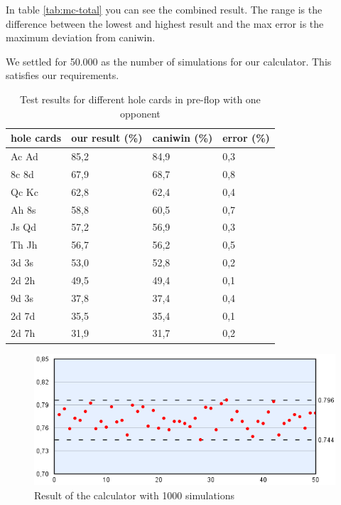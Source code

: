 In table \ref{tab:mc-total} you can see the combined result. The range is the difference between the lowest and highest result and the max error is the maximum deviation from caniwin.

We settled for 50.000 as the number of simulations for our calculator. This satisfies our requirements.

\vspace{4mm}
\def\arraystretch{1.5}
\begin{table}[H]
  \center
  \begin{tabular}{ | l | l | l | l | }
  	\hline
  	hole cards & our result (\%) & caniwin (\%) & error (\%) \\
  	\hline                       
    Ac Ad & 85,2 & 84,9 & 0,3 \\
    8c 8d & 67,9 & 68,7 & 0,8 \\
    Qc Kc & 62,8 & 62,4 & 0,4 \\
    Ah 8s & 58,8 & 60,5 & 0,7 \\
    Js Qd & 57,2 & 56,9 & 0,3 \\
    Th Jh & 56,7 & 56,2 & 0,5 \\
    3d 3s & 53,0 & 52,8 & 0,2 \\
    2d 2h & 49,5 & 49,4 & 0,1 \\
    9d 3s & 37,8 & 37,4 & 0,4 \\
    2d 7d & 35,5 & 35,4 & 0,1 \\
    2d 7h & 31,9 & 31,7 & 0,2 \\
  	\hline   	
  \end{tabular}
  \caption{Test results for different hole cards in pre-flop with one opponent \label{tab:pre-flop-test}}
\end{table}
\vspace{4mm} 

\begin{figure}[H]
  \center
    \includegraphics[scale=0.775]{images/MonteCarlo/1k.png}
  \caption{Result of the calculator with 1000 simulations \label{fig:mc1}}
\end{figure}

